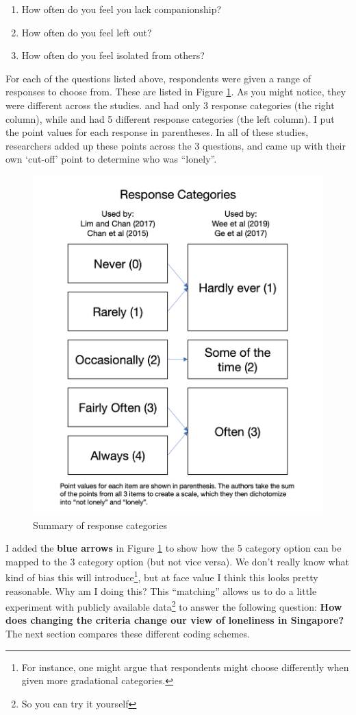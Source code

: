 \documentclass[
  openany]{book}
\providecommand{\tightlist}{%
  \setlength{\itemsep}{0pt}\setlength{\parskip}{0pt}}
\begin{document}
\begin{enumerate}
\def\labelenumi{\arabic{enumi}.}
\tightlist
\item
  How often do you feel you lack companionship?
\item
  How often do you feel left out?
\item
  How often do you feel isolated from others?
\end{enumerate}

For each of the questions listed above, respondents were given a range of responses to choose from. These are listed in Figure \ref{fig:st-lonely-graph}. As you might notice, they were different across the studies. \citet{wee_loneliness_2019} and \citet{ge_social_2017} had only 3 response categories (the right column), while \citet{lim_association_2017} and \citet{chan_loneliness_2015} had 5 different response categories (the left column). I put the point values for each response in parentheses. In all of these studies, researchers added up these points across the 3 questions, and came up with their own `cut-off' point to determine who was ``lonely''.

\begin{figure}

{\centering \includegraphics[width=0.5\linewidth]{images/loneliness/lonely_graph} 

}

\caption{Summary of response categories}\label{fig:st-lonely-graph}
\end{figure}

I added the \textbf{blue arrows} in Figure \ref{fig:st-lonely-graph} to show how the 5 category option can be mapped to the 3 category option (but not vice versa). We don't really know what kind of bias this will introduce\footnote{For instance, one might argue that respondents might choose differently when given more gradational categories.}, but at face value I think this looks pretty reasonable. Why am I doing this? This ``matching'' allows us to do a little experiment with publicly available data\footnote{So you can try it yourself} to answer the following question: \textbf{How does changing the criteria change our view of loneliness in Singapore?} The next section compares these different coding schemes.
\end{document}

